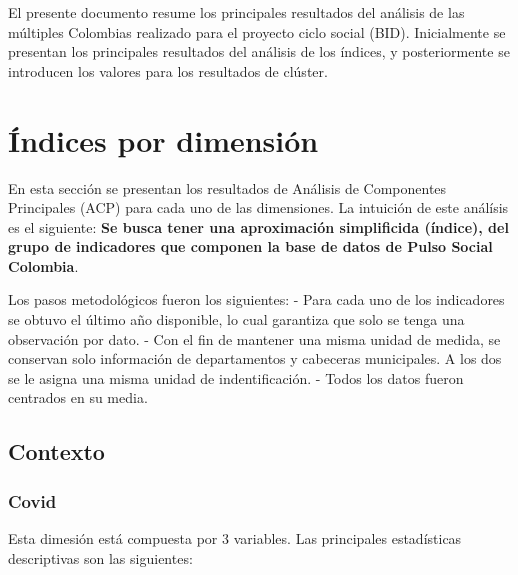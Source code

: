 El presente documento resume los principales resultados del análisis de
las múltiples Colombias realizado para el proyecto ciclo social (BID).
Inicialmente se presentan los principales resultados del análisis de los
índices, y posteriormente se introducen los valores para los resultados
de clúster.

\hypertarget{uxedndices-por-dimensiuxf3n}{%
\section{Índices por dimensión}\label{uxedndices-por-dimensiuxf3n}}

En esta sección se presentan los resultados de Análisis de Componentes
Principales (ACP) para cada uno de las dimensiones. La intuición de este
análísis es el siguiente: \textbf{Se busca tener una aproximación
simplificida (índice), del grupo de indicadores que componen la base de
datos de Pulso Social Colombia}.

Los pasos metodológicos fueron los siguientes: - Para cada uno de los
indicadores se obtuvo el último año disponible, lo cual garantiza que
solo se tenga una observación por dato. - Con el fin de mantener una
misma unidad de medida, se conservan solo información de departamentos y
cabeceras municipales. A los dos se le asigna una misma unidad de
indentificación. - Todos los datos fueron centrados en su media.

\hypertarget{contexto}{%
\subsection{Contexto}\label{contexto}}

\hypertarget{covid}{%
\subsubsection{Covid}\label{covid}}

Esta dimesión está compuesta por 3 variables. Las principales
estadísticas descriptivas son las siguientes:

